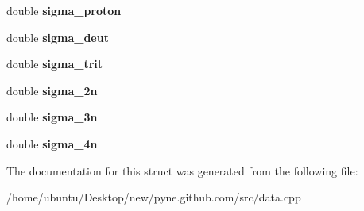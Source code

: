 \begin{DoxyCompactItemize}
\item 
double {\bfseries sigma\+\_\+proton}\hypertarget{structsimple__xs_aff5767a5644512bc20acdb7b6be11f6a}{}\label{structsimple__xs_aff5767a5644512bc20acdb7b6be11f6a}

\item 
double {\bfseries sigma\+\_\+deut}\hypertarget{structsimple__xs_a144a201fa75999fe72b1e7ff6cf599de}{}\label{structsimple__xs_a144a201fa75999fe72b1e7ff6cf599de}

\item 
double {\bfseries sigma\+\_\+trit}\hypertarget{structsimple__xs_ac94cd1b3c4d07c830484563268c9e3b4}{}\label{structsimple__xs_ac94cd1b3c4d07c830484563268c9e3b4}

\item 
double {\bfseries sigma\+\_\+2n}\hypertarget{structsimple__xs_a48428459c08bd8e7ca73ede3d5d1b12d}{}\label{structsimple__xs_a48428459c08bd8e7ca73ede3d5d1b12d}

\item 
double {\bfseries sigma\+\_\+3n}\hypertarget{structsimple__xs_a2d20b02fe8098c55466d12de065bfdee}{}\label{structsimple__xs_a2d20b02fe8098c55466d12de065bfdee}

\item 
double {\bfseries sigma\+\_\+4n}\hypertarget{structsimple__xs_a1c2a32a82a8f3e381d67b778c89c499e}{}\label{structsimple__xs_a1c2a32a82a8f3e381d67b778c89c499e}

\end{DoxyCompactItemize}


The documentation for this struct was generated from the following file\+:\begin{DoxyCompactItemize}
\item 
/home/ubuntu/\+Desktop/new/pyne.\+github.\+com/src/data.\+cpp\end{DoxyCompactItemize}
